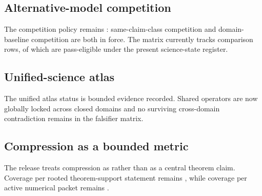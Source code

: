 \subsection{Alternative-model competition}
The competition policy remains : same-claim-class competition and domain-baseline competition are both in force. The matrix currently tracks  comparison rows, of which  are pass-eligible under the present science-state register.

\subsection{Unified-science atlas}
The unified atlas status is bounded evidence recorded. Shared operators are now globally locked across closed domains and no surviving cross-domain contradiction remains in the falsifier matrix.

\subsection{Compression as a bounded metric}
The release treats compression as  rather than as a central theorem claim. Coverage per rooted theorem-support statement remains , while coverage per active numerical packet remains .
